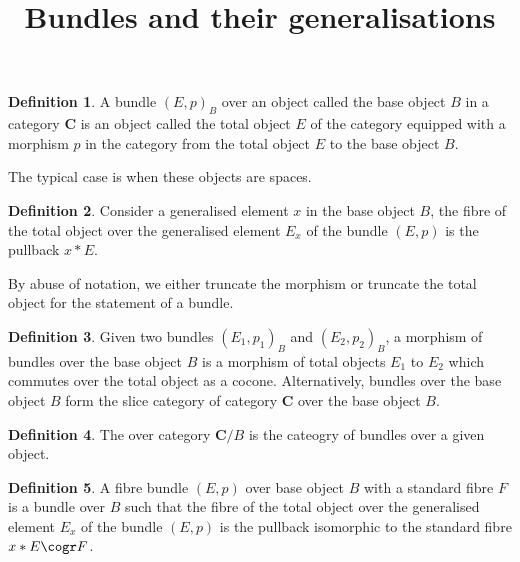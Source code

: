 \documentclass[10pt]{article}
\theoremstyle{plain}%
\theoremstyle{definition}
\newtheorem{definition}{Definition}[section]
\theoremstyle{remark}
\begin{document}
\title{Bundles and their generalisations}

\maketitle

\begin{definition}
	A bundle $(E, p)_B$ over an object called the base object $B$ in a category $\mathbf{C}$ is an object called the total object $E$ of the category equipped with a morphism $p$ in the category from the total object $E$ to the base object $B$.
\end{definition}

The typical case is when these objects are spaces.

\begin{definition}
	Consider a generalised element $x$ in the base object $B$, the fibre of the total object over the generalised element $E_x$ of the bundle $(E, p)$ is the pullback $x*E$.
\end{definition}

By abuse of notation, we either truncate the morphism or truncate the total object for the statement of a bundle.

\begin{definition}
	Given two bundles $(E_1, p_1)_B$ and $(E_2, p_2)_B$, a morphism of bundles over the base object $B$ is a morphism of total objects $E_1$ to $E_2$ which commutes over the total object as a cocone. Alternatively, bundles over the base object $B$ form the slice category of category $\mathbf{C}$ over the base object $B$. 
\end{definition}

\begin{definition}
	The over category $\mathbf{C} / B$ is the cateogry of bundles over a given object.
\end{definition}

\begin{definition}
	A fibre bundle $(E, p)$ over base object $B$ with a standard fibre $F$ is a bundle over $B$ such that the fibre of the total object over the generalised element $E_x$ of the bundle $(E, p)$ is the pullback isomorphic to the standard fibre $x*E \cogr F$.
\end{definition}
\end{document}
